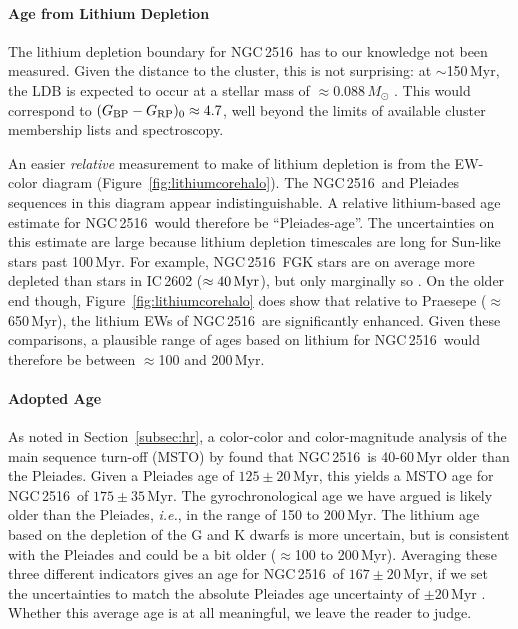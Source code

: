 \documentclass[12pt,twocolumn,tighten]{aastex63}
\newcommand{\cn}{NGC\,2516} %
\newcommand{\bpmrpo}{(G_{\rm BP}-G_{\rm RP})_0}
\begin{document}
\paragraph{Age from Lithium Depletion}
The lithium depletion boundary for \cn\ has to our knowledge not been
measured.  Given the distance to the cluster, this is not surprising:
at $\sim$150\,Myr, the LDB is expected to occur at a stellar mass of
$\approx$0.088\,$M_\odot$ \citep{soderblom_ages_2014}.  This would
correspond to $\bpmrpo\approx4.7$, well beyond the limits of available
cluster membership lists and spectroscopy.

An easier {\it relative} measurement to make of lithium depletion is
from the EW-color diagram (Figure~\ref{fig:lithiumcorehalo}).  The
\cn\ and Pleiades sequences in this diagram appear indistinguishable.
A relative lithium-based age estimate for \cn\ would therefore be
``Pleiades-age''.  The uncertainties on this estimate are large
because lithium depletion timescales are long for Sun-like stars past
100\,Myr.  For example,
\cn\ FGK stars are on average more depleted than stars in
IC\,2602 ($\approx40\,{\rm Myr}$), but only marginally so \citep{soderblom_ages_2014}.  On the
older end though, Figure~\ref{fig:lithiumcorehalo} does show that
relative to Praesepe ($\approx$650\,Myr), the lithium EWs of \cn\ are
significantly enhanced.  Given these comparisons, a plausible range of
ages based on lithium for \cn\ would therefore be between $\approx$100
and 200\,Myr.

\paragraph{Adopted Age}
As noted in Section~\ref{subsec:hr}, a color-color and color-magnitude analysis of the
main sequence turn-off (MSTO) by \citet{cummings_2018} found that \cn\
is 40-60\,Myr older than the Pleiades.  Given a Pleiades age of
$125\pm20$\,Myr, this yields a MSTO age for \cn\ of $175\pm35$\,Myr.
The gyrochronological age we have argued is likely older than the
Pleiades, {\it i.e.}, in the range of 150 to 200\,Myr.  The lithium
age based on the depletion of the G and K dwarfs is more uncertain,
but is consistent with the Pleiades and could be a bit older
($\approx$100 to 200\,Myr).  Averaging these three different
indicators gives an age for \cn\ of $167\pm20$\,Myr, if we set the
uncertainties to match the absolute Pleiades age uncertainty of $\pm
20\,$Myr \citep{soderblom_ages_2014}.  Whether this average age is at
all meaningful, we leave the reader to judge.
\end{document}
